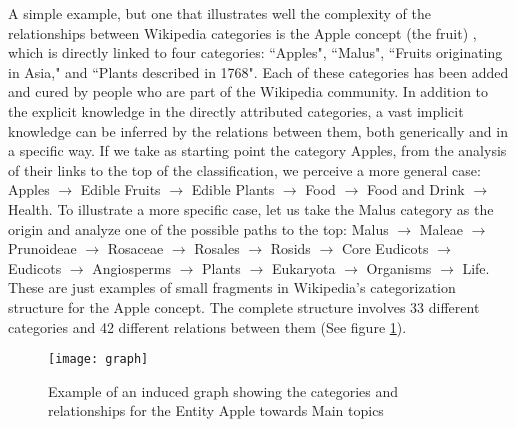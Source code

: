 A simple example, but one that illustrates well the complexity of the relationships between Wikipedia categories is the Apple concept (the fruit) , which is directly linked to four categories: ``Apples", ``Malus", ``Fruits originating in Asia," and ``Plants described in 1768". Each of these categories has been added and cured by people who are part of the Wikipedia community. In addition to the explicit knowledge in the directly attributed categories, a vast implicit knowledge can be inferred by the relations between them, both generically and in a specific way. If we take as starting point the category Apples, from the analysis of their links to the top of the classification, we perceive a more general case: Apples $\rightarrow$  Edible Fruits $\rightarrow$ Edible Plants $\rightarrow$ Food $\rightarrow$ Food and Drink $\rightarrow$ Health.
To illustrate a more specific case, let us take the Malus category as the origin and analyze one of the possible paths to the top: Malus $\rightarrow$ Maleae $\rightarrow$ Prunoideae $\rightarrow$ Rosaceae $\rightarrow$ Rosales $\rightarrow$ Rosids $\rightarrow$ Core Eudicots $\rightarrow$ Eudicots $\rightarrow$ Angiosperms $\rightarrow$ Plants $\rightarrow$ Eukaryota $\rightarrow$ Organisms $\rightarrow$ Life.
These are just examples of small fragments in Wikipedia's categorization structure for the Apple concept. The complete structure involves 33 different categories and 42 different relations between them (See figure \ref{fig:semantics-category-apple}).


\begin{figure}[H]
\centering
  \texttt{[image: graph]}
  \caption{Example of an induced graph showing the categories and relationships for the Entity Apple towards Main topics}
  \label{fig:semantics-category-apple}
\end{figure}






